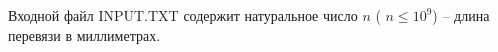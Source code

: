 Входной файл INPUT.TXT содержит натуральное число $n$ ( $n \leq 10^9$) -- длина перевязи в миллиметрах.